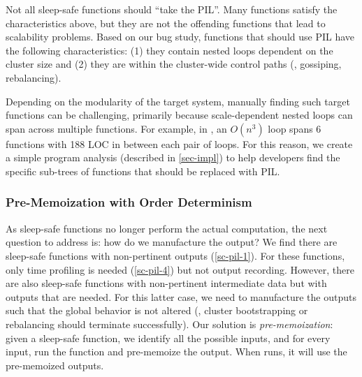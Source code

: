 Not all sleep-safe functions should ``take the PIL''.  Many functions
satisfy the characteristics above, but they are not the offending
functions that lead to scalability problems.  Based on our bug study,
functions that should use PIL have the following  characteristics:
%
(1) they contain nested loops dependent on the cluster
size
%
and (2) they are within the cluster-wide control paths (\eg, gossiping,
rebalancing).


Depending on the modularity of the target system, manually finding such
target functions can be challenging, primarily because scale-dependent
nested loops can span across multiple functions.  For example, in \caone,
an $O(n^3)$ loop spans 6 functions with 188 LOC in between each pair
of loops.  For this reason, we create a simple program analysis
\prx (described
in \sec\ref{sec-impl}) to help developers find the specific
sub-trees of functions that should be replaced with PIL.


\subsubsection{Pre-Memoization with Order Determinism}
\label{sc-pil-3}


As sleep-safe functions no longer perform the actual computation, the next
question to address is: how do we manufacture the output?  We find there
are sleep-safe functions with non-pertinent outputs
(\sec\ref{sc-pil-1}). For these functions, only time profiling is needed
(\sec\ref{sc-pil-4}) but not output recording.  However, there are also
sleep-safe functions with non-pertinent intermediate data but with outputs
that are needed.
%
For this latter case, we need to manufacture the outputs such that the
global behavior is not altered (\eg, cluster bootstrapping or rebalancing
should terminate successfully).
%
Our solution is {\em pre-memoization}: given a sleep-safe
function, we identify all the possible inputs, and for every input, run
the function and pre-memoize the output.  
When \sck runs, it will use the pre-memoized outputs.


